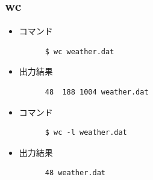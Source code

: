 \documentclass[paper=a4, fontsize=10pt]{jlreq}
\begin{document}
\subsection{wc}
\begin{itemize}
  \item コマンド
    \begin{lstlisting}
      $ wc weather.dat
    \end{lstlisting}

  \item 出力結果
    \begin{lstlisting}
      48  188 1004 weather.dat
    \end{lstlisting}

  \item コマンド
    \begin{lstlisting}
      $ wc -l weather.dat
    \end{lstlisting}

  \item 出力結果
    \begin{lstlisting}
      48 weather.dat
    \end{lstlisting}
  \end{itemize}
\end{document}
